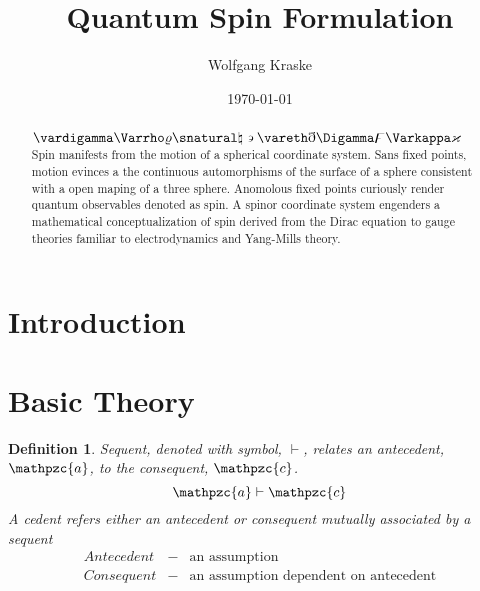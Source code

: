 \documentclass[aps,twocolumn,secnumarabic,nobalancelastpage,amsmath,amssymb,
amsthm,nofootinbib,parskip=full]{revtex4}
\numberwithin{equation}{section}
\newtheorem{definition}{Definition}[section]
\newcommand{\obk}[1]{\mathpzc{#1}}
\begin{document}
\title{Quantum Spin Formulation}
\author         {Wolfgang Kraske}
\date{\today}

\begin{abstract}
$\vardigamma\Varrho\varrho\snatural\natural\backepsilon\vareth\eth\Digamma\digamma\Varkappa\varkappa$
Spin manifests from the motion of a spherical coordinate system. Sans fixed
points, motion evinces a the continuous automorphisms of the surface of a
sphere consistent with a open maping of a three sphere. Anomolous
fixed points curiously render quantum observables denoted as spin.
A spinor coordinate system engenders a mathematical conceptualization of
spin derived from the Dirac equation to gauge theories familiar to
electrodynamics and Yang-Mills theory. 
\end{abstract}

\maketitle

\setlength{\parindent}{0em}
\setlength{\parskip}{0.5em}
\renewcommand{\baselinestretch}{1.0}

\section{Introduction}


\section{Basic Theory}\label{sec:basictheory}

\begin{definition}{Sequent}\label{def:sequent},
  denoted with symbol, $\vdash$, relates an
  antecedent, $\obk{a}$, to the consequent, $\obk{c}$.
\begin{equation*}
\obk{a}\vdash\obk{c}
\end{equation*}
A cedent refers either an antecedent or consequent mutually
associated by a sequent
  \begin{equation*}
  \begin{array}{rll}
   Antecedent&-&\text{an assumption} \\[3pt]
   Consequent&-&\text{an assumption dependent on antecedent}
  \end{array}
  \end{equation*}
\end{definition}
\end{document}
